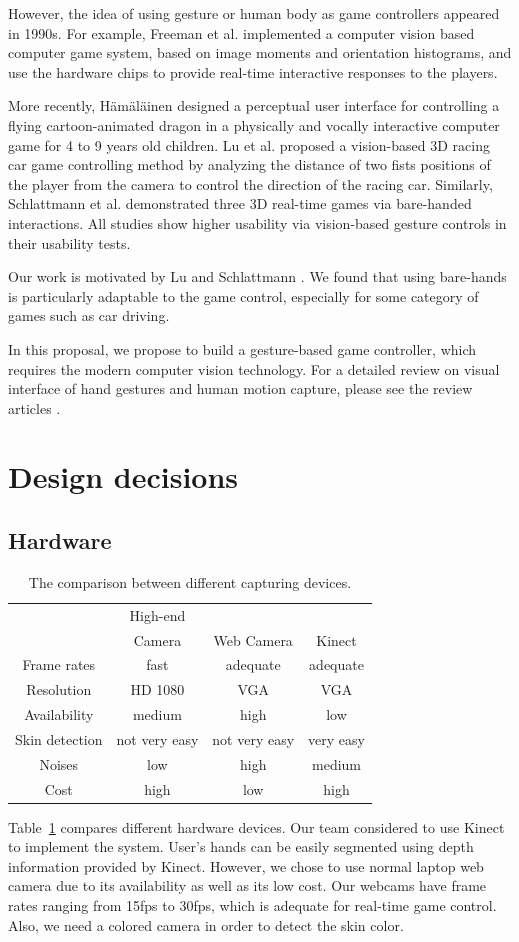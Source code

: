 \documentclass[10pt,twocolumn,letterpaper]{article}
\begin{document}
However, the idea of using gesture or human body as game
controllers appeared in 1990s. For example, 
Freeman et al. \cite{cvicg, cvfcg} implemented a computer vision based 
computer game system, based on image moments and orientation histograms, and 
use the hardware chips to provide real-time interactive responses to the players. 

More recently, H\"{a}m\"{a}l\"{a}inen \cite{childgame} designed a perceptual user interface for
controlling a flying cartoon-animated dragon in a
physically and vocally interactive computer game for 4 to 9 years old children.
Lu et al. \cite{racecar} proposed a vision-based 3D racing car game controlling
method by analyzing the distance of two fists positions of the player
from the camera to control the direction of the racing car. Similarly, 
Schlattmann \cite{3dgames} et al. demonstrated three 3D real-time games via bare-handed 
interactions. All studies show higher usability via vision-based gesture controls 
in their usability tests.

Our work is motivated by Lu \cite{racecar} and 
Schlattmann \cite{3dgames}. We found that using bare-hands is particularly 
adaptable to the game control, especially for some category of games such as 
car driving. 

In this proposal, we propose to build a gesture-based game controller, which 
requires the modern computer vision technology. For a detailed review on visual 
interface of hand gestures and human motion capture, please see 
the review articles \cite{pamireview, cviureview}.

\section{Design decisions}
\subsection{Hardware}
\begin{table}[b!]
\begin{tabular}{c|ccc}
&High-end\\
&Camera&Web Camera&Kinect \\
\hline
Frame rates & fast & adequate & adequate \\
Resolution & HD 1080 & VGA & VGA \\
Availability & medium & high & low \\
Skin detection & not very easy & not very easy & very easy \\
Noises & low & high & medium \\
Cost & high & low & high 
\end{tabular}
\caption{The comparison between different capturing devices.}
\label{tab:hw}
\end{table}
Table~\ref{tab:hw} compares different hardware devices.
Our team considered to use Kinect to implement the system. 
User's hands can be easily segmented using depth information 
provided by Kinect. However, 
we chose to use normal laptop web camera due to its availability as well as its 
low cost. 
Our webcams have frame rates ranging from 15fps to 30fps, which is adequate for real-time 
game control. Also, we need a colored camera in order to detect the skin color.
\end{document}
